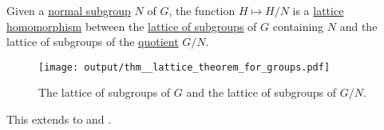 \begin{theorem}\label{thm:quotient_subgroup_lattice_theorem}
  Given a \hyperref[thm:normal_subgroup_equivalences]{normal subgroup} \( N \) of \( G \), the function \( H \mapsto H / N \) is a \hyperref[def:semilattice/homomorphism]{lattice homomorphism} between the \hyperref[thm:substructures_form_complete_lattice]{lattice of subgroups} of \( G \) containing \( N \) and the lattice of subgroups of the \hyperref[def:group/quotient]{quotient} \( G / N \).

  \begin{figure}[!ht]
    \centering
    \texttt{[image: output/thm\_\_lattice\_theorem\_for\_groups.pdf]}
    \caption{The lattice of subgroups of \( G \) and the lattice of subgroups of \( G / N \).}
    \label{fig:thm:quotient_subgroup_lattice_theorem}
  \end{figure}

  This extends to  and .
\end{theorem}
